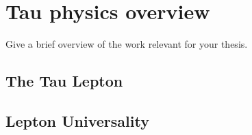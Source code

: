 \chapter{Tau physics overview}\label{chap:relatedwork}
Give a brief overview of the work relevant for your thesis. 

\section{The Tau Lepton}

\section{Lepton Universality}




